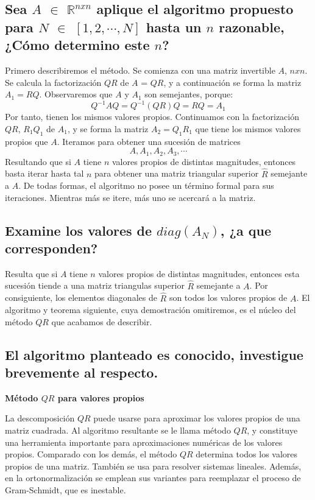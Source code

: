 \subsection{Sea $A$ $\in$ $\mathbb{R}^{nxn}$ aplique el algoritmo propuesto para $N$ $\in$
$[1,2,\cdots,N]$ hasta un $n$ razonable, ¿Cómo determino este $n$?}

Primero describiremos el método. Se comienza con una matriz invertible $A$, $n x n$. Se calcula la
factorización $QR$ de $A$ = $QR$, y a continuación se forma la matriz $A_1 = RQ$. Observaremos que $A$ y
$A_1$ son semejantes, porque:
$$
	Q^{-1} AQ = Q^{-1} (QR) Q = RQ = A_1
$$
Por tanto, tienen los mismos valores propios. Continuamos con la factorización $QR$, $R_1Q_1$ de $A_1$, y se forma
la matriz $A_2 = Q_1 R_1$ que tiene los mismos valores propios que $A$. Iteramos para obtener una sucesión de
matrices
$$
	A, A_1, A_2, A_3, \cdots
$$
Resultando que si $A$ tiene $n$ valores propios de distintas magnitudes, entonces basta iterar hasta tal
$n$ para obtener una matriz triangular superior $\hat{R}$ semejante a $A$. De todas formas, el algoritmo
no posee un término formal para sus iteraciones. Mientras más se itere, más uno se acercará a la matriz.

\subsection{Examine los valores de $diag(A_N)$, ¿a que corresponden?}

Resulta que si $A$ tiene $n$ valores propios de distintas magnitudes, entonces esta sucesión tiende a una
matriz triangulas superior $\hat{R}$ semejante a $A$.
Por consiguiente, los elementos diagonales de $\hat{R}$ son todos los valores propios de $A$.
El algoritmo y teorema siguiente, cuya demostración omitiremos, es el núcleo del método $QR$ que acabamos
de describir.

\subsection{El algoritmo planteado es conocido, investigue brevemente al respecto.}
\textbf{Método $QR$ para valores propios}
 
La descomposición $QR$ puede usarse para aproximar los valores propios de una matriz cuadrada. Al algoritmo
resultante se le llama método $QR$, y constituye una herramienta importante para aproximaciones numéricas
de los valores propios. Comparado con los demás, el método $QR$ determina todos los valores propios de una
matriz. También se usa para resolver sistemas lineales. Además, en la ortonormalización se emplean sus
variantes para reemplazar el proceso de Gram-Schmidt, que es inestable.

